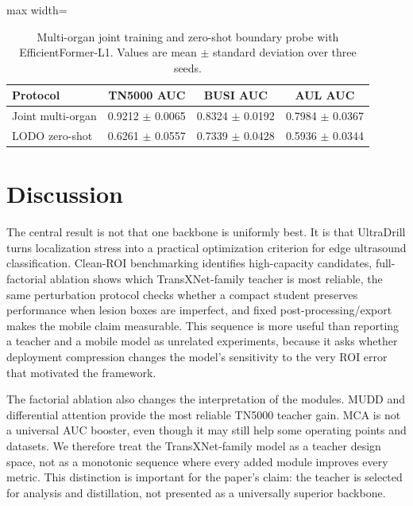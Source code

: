 \documentclass[preprint,12pt]{elsarticle}
\begin{document}
\begin{table}[!htbp]
    \centering
    \small
    \caption{Multi-organ joint training and zero-shot boundary probe with EfficientFormer-L1. Values are mean $\pm$ standard deviation over three seeds.}
    \label{tab:cross_organ}
    \begin{adjustbox}{max width=\columnwidth}
    \begin{tabular}{lccc}
        \toprule
        Protocol & TN5000 AUC & BUSI AUC & AUL AUC \\
        \midrule
        Joint multi-organ & 0.9212 $\pm$ 0.0065 & 0.8324 $\pm$ 0.0192 & 0.7984 $\pm$ 0.0367 \\
        LODO zero-shot & 0.6261 $\pm$ 0.0557 & 0.7339 $\pm$ 0.0428 & 0.5936 $\pm$ 0.0344 \\
        \bottomrule
    \end{tabular}
    \end{adjustbox}
\end{table}

\section{Discussion}
\label{sec:discussion}

The central result is not that one backbone is uniformly best. It is that UltraDrill turns localization stress into a practical optimization criterion for edge ultrasound classification. Clean-ROI benchmarking identifies high-capacity candidates, full-factorial ablation shows which TransXNet-family teacher is most reliable, the same perturbation protocol checks whether a compact student preserves performance when lesion boxes are imperfect, and fixed post-processing/export makes the mobile claim measurable. This sequence is more useful than reporting a teacher and a mobile model as unrelated experiments, because it asks whether deployment compression changes the model's sensitivity to the very ROI error that motivated the framework.

The factorial ablation also changes the interpretation of the modules. MUDD and differential attention provide the most reliable TN5000 teacher gain. MCA is not a universal AUC booster, even though it may still help some operating points and datasets. We therefore treat the TransXNet-family model as a teacher design space, not as a monotonic sequence where every added module improves every metric. This distinction is important for the paper's claim: the teacher is selected for analysis and distillation, not presented as a universally superior backbone.
\end{document}
